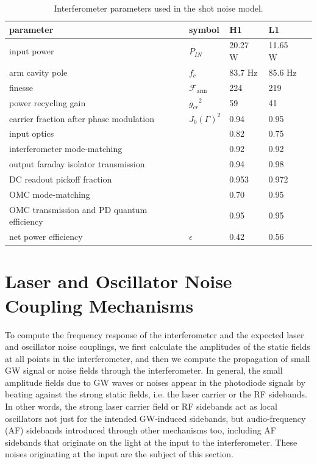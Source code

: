 \begin{table}[t]
\centering
\begin{tabular}{l l l l l}
\hline 
parameter           &  symbol           &  H1          & L1       \\ 
\hline
input power         &  $P_{IN}$         & 20.27 W      & 11.65 W  \\
arm cavity pole     &  $f_c$            &  83.7 Hz     & 85.6  Hz \\
finesse    & $\mathcal{F}_\textrm{arm}$ &  224         & 219      \\
power recycling gain&  ${g_{cr}}^2$     &  59          & 41       \\
\hline
carrier fraction after
phase modulation    &  $J_0(\Gamma)^2$  & 0.94         & 0.95 \\
input optics        &                   & 0.82         & 0.75  \\
interferometer mode-matching &          & 0.92         & 0.92  \\
output faraday isolator transmission &  & 0.94         & 0.98  \\
DC readout pickoff fraction  &          & 0.953        & 0.972 \\
OMC mode-matching            &          & 0.70         & 0.95  \\
OMC transmission and 
PD quantum efficiency        &          & 0.95         & 0.95  \\
\hline
net power efficiency         &$\epsilon$& 0.42         & 0.56  \\
\hline
\end{tabular}
\caption{\label{tab:ifo-properties}Interferometer parameters used in the
  shot noise model.}
\end{table}


\section{Laser and Oscillator Noise Coupling Mechanisms}


To compute the frequency response of the interferometer and the
expected laser and oscillator noise couplings, we first calculate the
amplitudes of the static fields at all points in the interferometer,
and then we compute the propagation of small GW signal or noise fields
through the interferometer.  In general, the small amplitude fields
due to GW waves or noises appear in the photodiode signals by beating
against the strong static fields, i.e. the laser carrier or the RF
sidebands.  In other words, the strong laser carrier field or RF
sidebands act as local oscillators not just for the intended
GW-induced sidebands, but audio-frequency (AF) sidebands introduced
through other mechanisms too, including AF sidebands that originate on
the light at the input to the interferometer.  These noises originating
at the input are the subject of this section.


